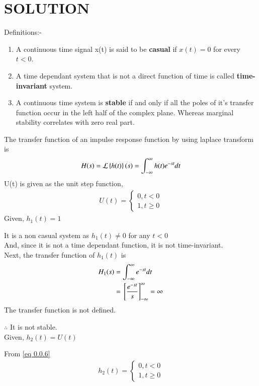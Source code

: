 \documentclass[journal,12pt,twocolumn]{IEEEtran}
\begin{document}
\section*{SOLUTION}
Definitions:-
\begin{enumerate}
    \item A continuous time signal x(t) is said to be \textbf{casual} if $x(t) = 0$ for every $t<0$.\\
    \item A time dependant system that is not a direct function of time is called \textbf{time-invariant} system.\\
    \item A continuous time system is \textbf{stable} if and only if all the poles of it's transfer function occur in the left half of the complex plane. Whereas marginal stability correlates with zero real part.\\
\end{enumerate}
    The transfer function of an impulse response function by using laplace transform is
    \begin{align}
    H(s) = \mathcal{L}\left\{h(t)\right\}(s) = \int_{-\infty}^{\infty} h(t)e^{-st} dt
    \end{align}
    U(t) is given as the unit step function,
\begin{align}
    U(t) = 
    \begin{cases}
    0, t<0\\
    1, t\geq 0
    \end{cases} \label{eq 0.0.6}
\end{align}
Given, $h_1(t) = 1$

It is a non casual system as $h_1(t) \neq 0$ for any $t<0$\\
And, since it is not a time dependant function, it is not time-invariant.\\
Next, the transfer function of $h_1(t)$ is
\begin{align}
    H_1(s) &= \int_{-\infty}^{\infty} e^{-st} dt\\
    &= {}\left[\frac{e^{-st}}{s}\right]_{-\infty}^{\infty} = \infty
\end{align}
The transfer function is not defined. 

$\therefore$ It is not stable.\\

Given, $h_2(t) = U(t)$

From \eqref{eq 0.0.6}
\begin{align}
    h_2(t) = 
    \begin{cases}
    0, t<0\\
    1, t\geq 0
    \end{cases}
\end{align}
\end{document}

